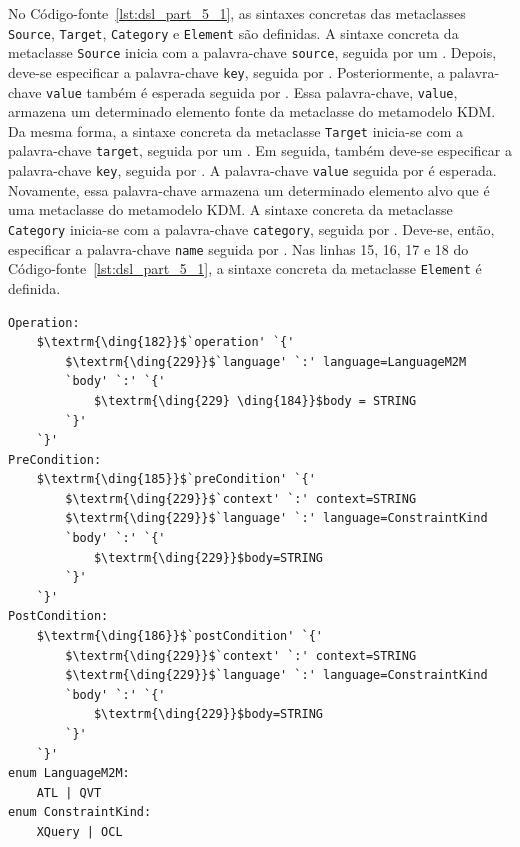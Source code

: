 No Código-fonte~\ref{lst:dsl_part_5_1}, as sintaxes concretas das metaclasses \texttt{Source}, \texttt{Target}, \texttt{Category} e \texttt{Element} são definidas. A sintaxe concreta da metaclasse \texttt{Source} inicia com a palavra-chave \texttt{source}, seguida por um \aspas{\{}. Depois, deve-se especificar a palavra-chave \texttt{key}, seguida por \aspas{\texttt{:}}. Posteriormente, a palavra-chave \texttt{value} também é esperada seguida por \aspas{\texttt{:}}. Essa palavra-chave, \texttt{value}, armazena um determinado elemento fonte da metaclasse do metamodelo KDM. Da mesma forma, a sintaxe concreta da metaclasse \texttt{Target} inicia-se com a palavra-chave \texttt{target}, seguida por um \aspas{\{}. Em seguida, também deve-se especificar a palavra-chave \texttt{key}, seguida por \aspas{\texttt{:}}. A palavra-chave \texttt{value} seguida por \aspas{\texttt{:}} é esperada. Novamente, essa palavra-chave armazena um determinado elemento alvo que é uma metaclasse do metamodelo KDM. A sintaxe concreta da metaclasse \texttt{Category} inicia-se com a palavra-chave \texttt{category}, seguida por \aspas{\texttt{:}} . Deve-se, então, especificar a palavra-chave \texttt{name} seguida por \aspas{\texttt{:}}. Nas linhas 15, 16, 17 e 18 do Código-fonte~\ref{lst:dsl_part_5_1}, a sintaxe concreta da metaclasse \texttt{Element} é definida. 



\begin{lstlisting}[language=Xtext, frame=single, basicstyle=\scriptsize, mathescape=true, label={lst:dsl_part_5}, caption={Gramática da DSL - parte 6}]
Operation: 
	$\textrm{\ding{182}}$`operation' `{'
		$\textrm{\ding{229}}$`language' `:' language=LanguageM2M
		`body' `:' `{'
			$\textrm{\ding{229} \ding{184}}$body = STRING
		`}'
	`}'
PreCondition: 
	$\textrm{\ding{185}}$`preCondition' `{'
		$\textrm{\ding{229}}$`context' `:' context=STRING
		$\textrm{\ding{229}}$`language' `:' language=ConstraintKind
		`body' `:' `{' 
			$\textrm{\ding{229}}$body=STRING	
		`}'
	`}'
PostCondition: 
	$\textrm{\ding{186}}$`postCondition' `{'
		$\textrm{\ding{229}}$`context' `:' context=STRING
		$\textrm{\ding{229}}$`language' `:' language=ConstraintKind
		`body' `:' `{' 
			$\textrm{\ding{229}}$body=STRING	
		`}'
	`}'
enum LanguageM2M: 
	ATL | QVT
enum ConstraintKind: 
	XQuery | OCL

\end{lstlisting}

